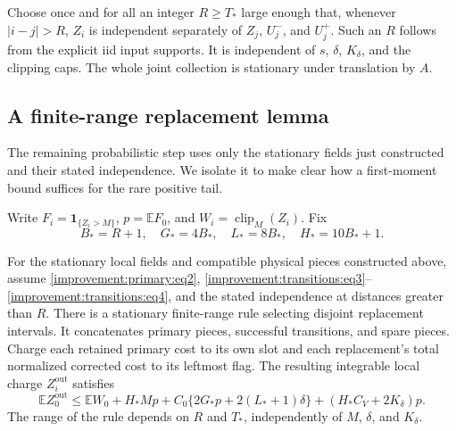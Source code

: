 Choose once and for all an integer $R\geq T_*$ large enough that,
whenever $|i-j|>R$, $Z_i$ is independent separately of $Z_j$, $U_j^-$,
and $U_j^+$. Such an $R$ follows from the explicit iid input supports.
It is independent of $s$, $\delta$, $K_\delta$, and the clipping caps.
The whole joint collection is stationary under translation by $A$.

\subsection{A finite-range replacement lemma}
\label{improvement:flags}

The remaining probabilistic step uses only the stationary fields just
constructed and their stated independence. We isolate it to make clear
how a first-moment bound suffices for the rare positive tail.

Write $F_i=\mathbf1_{\{Z_i>M\}}$, $p=\mathbb EF_0$, and
$W_i=\operatorname{clip}_M(Z_i)$. Fix
\begin{equation}
 B_*=R+1,\quad G_*=4B_*,\quad L_*=8B_*,\quad H_*=10B_*+1.
 \label{improvement:flags:eq1}
\end{equation}

\begin{lemma}
\label{improvement:replacement}
For the stationary local fields and compatible physical pieces
constructed above, assume \eqref{improvement:primary:eq2},
\eqref{improvement:transitions:eq3}--\eqref{improvement:transitions:eq4},
and the stated independence at distances greater than $R$. There is a
stationary finite-range rule selecting disjoint replacement intervals.
It concatenates primary pieces, successful transitions, and spare
pieces. Charge each retained primary cost to its own slot and each
replacement's total normalized corrected cost to its leftmost flag.
The resulting integrable local charge $Z_i^{\mathrm{out}}$ satisfies
\begin{equation}
 \mathbb E Z_0^{\mathrm{out}}
 \le \mathbb EW_0+H_*Mp
 +C_0\{2G_*p+2(L_*+1)\delta\}
 +(H_*C_V+2K_\delta)p.
 \label{improvement:flags:eq8}
\end{equation}
The range of the rule depends on $R$ and $T_*$, independently of $M$,
$\delta$, and $K_\delta$.
\end{lemma}

